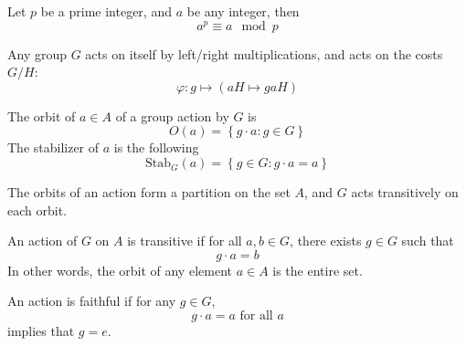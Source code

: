 \documentclass[openany]{book}
\begin{document}
\begin{thm}
    Let $p$ be a prime integer, and $a$ be any integer, then 
    \begin{equation*}
        a^p\equiv a\mod p
    \end{equation*}
\end{thm}


\begin{prop}
    Any group $G$ acts on itself by left/right multiplications, and acts on the costs $G/H$:
    \begin{equation*}
        \varphi: g\mapsto \left(aH\mapsto gaH\right)
    \end{equation*}
\end{prop}


\begin{defn}[orbit]
    The orbit of $a\in A$ of a group action by $G$ is 
    \begin{equation*}
        O(a)=\left\{g\cdot a: g\in G\right\}
    \end{equation*}
    The stabilizer of $a$ is the following 
    \begin{equation*}
        \text{Stab}_G(a)=\left\{g\in G: g\cdot a=a\right\}
    \end{equation*}
\end{defn}

\begin{prop}
    The orbits of an action form a partition on the set $A$, and $G$ acts transitively on each orbit.
\end{prop}

\begin{defn}




    An action of $G$ on $A$ is transitive if for all $a,b\in G$, there exists $g\in G$ such that 
    \begin{equation*}
        g\cdot a=b
    \end{equation*}
    In other words, the orbit of any element $a\in A$ is the entire set.

    An action is faithful if for any $g\in G$, 
    \begin{equation*}
        g\cdot a=a \text{ for all } a
    \end{equation*}
    implies that $g=e$.
\end{defn}
\end{document}

